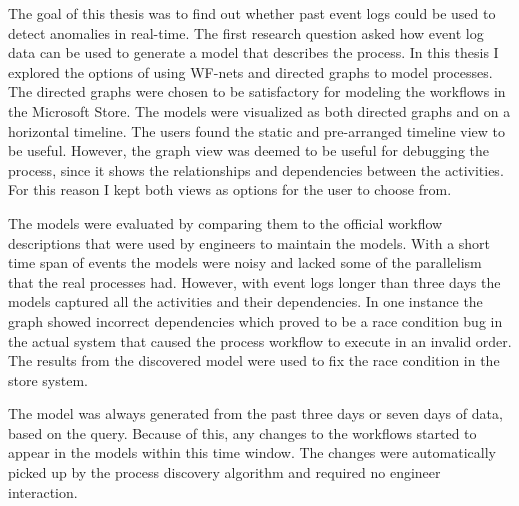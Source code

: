

The goal of this thesis was to find out whether past event logs could be used to detect anomalies in real-time. 
The first research question asked how event log data can be used to generate a model that describes the process.
In this thesis I explored the options of using WF-nets and directed graphs to model processes.
The directed graphs were chosen to be satisfactory for modeling the workflows in the Microsoft Store.
The models were visualized as both directed graphs and on a horizontal timeline.
The users found the static and pre-arranged timeline view to be useful. 
However, the graph view was deemed to be useful for debugging the process, since it shows the relationships and dependencies between the activities.
For this reason I kept both views as options for the user to choose from.

The models were evaluated by comparing them to the official workflow descriptions that were used by engineers to maintain the models. 
With a short time span of events the models were noisy and lacked some of the parallelism that the real processes had.
However, with event logs longer than three days the models captured all the activities and their dependencies.
In one instance the graph showed incorrect dependencies which proved to be a race condition bug in the actual system that caused the process workflow to execute in an invalid order.
The results from the discovered model were used to fix the race condition in the store system.

The model was always generated from the past three days or seven days of data, based on the query. Because of this, any changes to the workflows started to appear in the models within this time window. 
The changes were automatically picked up by the process discovery algorithm and required no engineer interaction.

